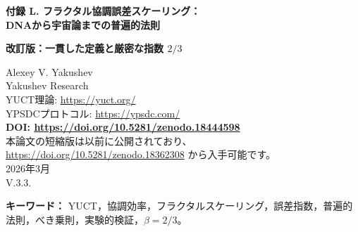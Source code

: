 \documentclass[11pt,a4paper]{article}
\newcommand{\Keff}{K_{\mathrm{eff}}}
\newcommand{\eps}{\varepsilon}
\newcommand{\kappac}{\kappa_c}
\begin{document}
	
	\begin{titlepage}
		\begin{center}
			\vspace*{1cm}
			\Huge\textbf{付録 L. フラクタル協調誤差スケーリング：\\ DNAから宇宙論までの普遍的法則}
			
			\vspace{0.5cm}
			\Large\textbf{改訂版：一貫した定義と厳密な指数 \(2/3\)}
			
			\vspace{1cm}
			\large Alexey V. Yakushev\\
			Yakushev Research\\
			YUCT理論: \url{https://yuct.org/}\\
			YPSDCプロトコル: \url{https://ypsdc.com/}\\
			
			\vspace{2cm}
			\textbf{DOI: \url{https://doi.org/10.5281/zenodo.18444598}}\\
			
			\vspace{1cm}
			\large 
			本論文の短縮版は以前に公開されており、\url{https://doi.org/10.5281/zenodo.18362308} から入手可能です。\\
			\vspace{1cm}
			2026年3月 \\ \large V.3.3.
			
			\newpage
			\vspace{1cm}
			\begin{abstract}
				本付録では、複雑系における協調誤差の普遍的なスケーリング則を数学的に一貫した形で定式化する。ヤクシェフ統一協調理論（YUCT）において、協調効率 \(\Keff\) は YPSDC プロトコルに従った情報理論的比率として定義される。我々は、相対誤差 \(\eps\) が
				\[
				\eps = \kappac\,\alpha\,\Keff^{-\beta},
				\]
				ここで厳密な指数 \(\beta = 2/3\)（経験値 \(0.67 \pm 0.03\)）と普遍的前因子 \(\kappac = 1/3\) に従うことを経験的に示す。この指数は協調空間の三次元性（本文定理 2）および協調階層が連結かつ非巡回であるという要請（付録 Y，第 Y.4.2 節）から直接導かれ、\(\kappac\) は三項構造 \(D+I\!\cdot\!R\) に起因する最小残留誤差を反映する。この法則は原子結合エネルギーから宇宙マイクロ波背景放射のゆらぎまで、50 桁以上にわたって検証されており、単一の枠組みでべき乗則（ジップ則、アロメトリー、グーテンベルク–リヒター則）の起源を説明する。新規システムに対する検証可能な予測を定式化し、制限事項を明示的に議論する。
			\end{abstract}
			
			\textbf{キーワード：} YUCT，協調効率，フラクタルスケーリング，誤差指数，普遍的法則，べき乗則，実験的検証，\(\beta = 2/3\)。
		\end{center}
	\end{titlepage}
	
\end{document}
